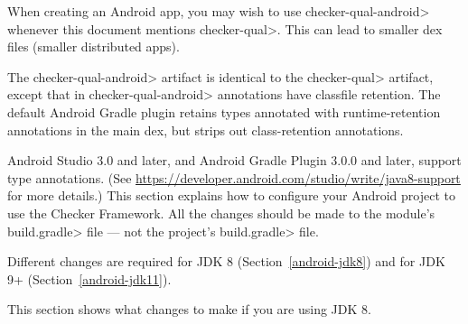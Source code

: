 
When creating an Android app, you may wish to use \<checker-qual-android>
whenever this document mentions \<checker-qual>.  This can lead to smaller
dex files (smaller distributed apps).

The \<checker-qual-android> artifact is identical to the \<checker-qual>
artifact, except that in \<checker-qual-android> annotations have classfile
retention.  The default Android Gradle plugin retains types annotated with
runtime-retention annotations in the main dex, but strips out class-retention
annotations.



Android Studio 3.0 and later, and Android Gradle Plugin 3.0.0 and later, support type
annotations.  (See
\url{https://developer.android.com/studio/write/java8-support}
for more details.)  This section explains how to configure your Android
project to use the Checker Framework.  All the changes should be made to
the module's \<build.gradle> file --- not the project's \<build.gradle> file.

Different changes are required for JDK 8
(Section~\ref{android-jdk8}) and for JDK 9+ (Section~\ref{android-jdk11}).

This section shows what changes to make if you are using JDK 8.

